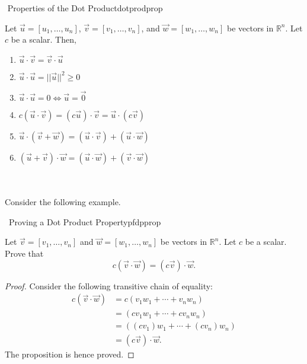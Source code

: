         \begin{theorem}{\Stop\,\,Properties of the Dot Product}{dotprodprop}
    
            Let \(\vec{u}=[u_1,\ldots,u_n]\), \(\vec{v}=[v_1,\ldots,v_n]\), and \(\vec{w}=[w_1,\ldots,w_n]\) be vectors in \(\mathbb{R}^n\). Let \(c\) be a scalar. Then,
            \begin{enumerate}
                \item \(\vec{u}\cdot\vec{v}=\vec{v}\cdot\vec{u}\)
                \item \(\vec{u}\cdot\vec{u}=||\vec{u}||^2\geq0\) 
                \item \(\vec{u}\cdot\vec{u}=0\iff\vec{u}=\vec{0}\)
                \item \(c(\vec{u}\cdot\vec{v})=(c\vec{u})\cdot\vec{v}=\vec{u}\cdot(c\vec{v})\)
                \item \(\vec{u}\cdot(\vec{v}+\vec{w})=(\vec{u}\cdot\vec{v})+(\vec{u}\cdot\vec{w})\)
                \item \((\vec{u}+\vec{v})\cdot\vec{w}=(\vec{u}\cdot\vec{w})+(\vec{v}\cdot\vec{w})\)
            \end{enumerate}
        
        \end{theorem}
        \pagebreak
        \vphantom
        \\
        \\
        Consider the following example.
        \begin{example}{\Difficulty\,\Difficulty\,\,Proving a Dot Product Property}{pfdpprop}
                
            Let \(\vec{v}=[v_1,\ldots,v_n]\) and \(\vec{w}=[w_1,\ldots,w_n]\) be vectors in \(\mathbb{R}^n\). Let \(c\) be a scalar. Prove that
            \begin{equation*}
                c(\vec{v}\cdot\vec{w})=(c\vec{v})\cdot\vec{w}.
            \end{equation*}
            \begin{proof}
                Consider the following transitive chain of equality:
                \begin{align*}
                     c(\vec{v}\cdot\vec{w})&=c(v_1w_1+\cdots+v_nw_n) \\
                     &=(cv_1w_1+\cdots+cv_nw_n) \\
                     &=((cv_1)w_1+\cdots+(cv_n)w_n) \\
                     &=(c\vec{v})\cdot\vec{w}.
                \end{align*}
                The proposition is hence proved.
            \end{proof}
        
        \end{example}
